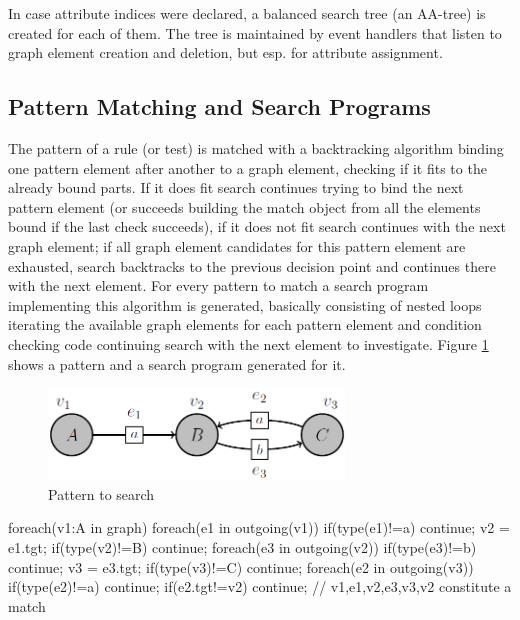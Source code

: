 In case attribute indices were declared, a balanced search tree (an AA-tree) is created for each of them.
The tree is maintained by event handlers that listen to graph element creation and deletion, but esp. for attribute assignment.
 
\subsection*{Pattern Matching and Search Programs}
The pattern of a rule (or test) is matched with a backtracking algorithm binding one pattern element after another to a graph element, checking if it fits to the already bound parts. If it does fit search continues trying to bind the next pattern element (or succeeds building the match object from all the elements bound if the last check succeeds), if it does not fit search continues with the next graph element; if all graph element candidates for this pattern element are exhausted, search backtracks to the previous decision point and continues there with the next element.
For every pattern to match a search program implementing this algorithm is generated, basically consisting of nested loops iterating the available graph elements for each pattern element and condition checking code continuing search with the next element to investigate.
Figure \ref{figpatterntosearchfirst} shows a pattern and a search program generated for it.

\begin{figure}[htbp]
  \centering
  \includegraphics[width=0.7\textwidth]{fig/Pattern}
  \caption{Pattern to search}
  \label{figpatterntosearchfirst}
\end{figure}

\begin{csharp}
foreach(v1:A in graph) {
	foreach(e1 in outgoing(v1)) {
		if(type(e1)!=a) continue;
		v2 = e1.tgt;
		if(type(v2)!=B) continue;
		foreach(e3 in outgoing(v2)) {
			if(type(e3)!=b) continue;
			v3 = e3.tgt;
			if(type(v3)!=C) continue;
			foreach(e2 in outgoing(v3)) {
				if(type(e2)!=a) continue;
				if(e2.tgt!=v2) continue;
				// v1,e1,v2,e3,v3,v2 constitute a match
			} 
		}
	}
}
\end{csharp}

